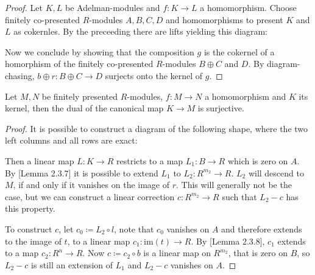 \begin{proof}
  Let $K,L$ be Adelman-modules and $f:K\to L$ a homomorphism.
  Choose finitely co-presented $R$-modules $A,B,C,D$ and homomorphisms to present $K$ and $L$ as cokernles.
  By the preceeding  there are lifts yielding this diagram:
  \begin{center}
  \end{center}
  Now we conclude by showing that the composition $g$ is the cokernel of a homorphism of the finitely co-presented $R$-modules $B\oplus C$ and $D$.
  By diagram-chasing, $b\oplus r:B\oplus C\to D$ surjects onto the kernel of $g$.
\end{proof}

\begin{lemma}
  \label{fp-kernel-dual-surjective}
  Let $M,N$ be finitely presented $R$-modules, $f:M\to N$ a homomorphism and $K$ its kernel,
  then the dual of the canonical map $K\to M$ is surjective.
\end{lemma}

\begin{proof}
  It is possible  to construct a diagram of the following shape, where the two left columns and all rows are exact:
  \begin{center}
  \end{center}
  Then a linear map $L:K\to R$ restricts to a map $L_1:B\to R$ which is zero on $A$.
  By \cite{diffgeo-article}[Lemma 2.3.7] it is possible to extend $L_1$ to $L_2:R^{m_2}\to R$.
  $L_2$ will descend to $M$, if and only if it vanishes on the image of $r$.
  This will generally not be the case, but we can construct a linear correction $c:R^{m_2}\to R$ such that $L_2-c$ has this property.

  To construct $c$, let $c_0\coloneq L_2\circ l$, note that $c_0$ vanishes on $A$ and therefore extends to the image of $t$, to a linear map $c_1:\mathrm{im}(t)\to R$.
  By \cite{diffgeo-article}[Lemma 2.3.8], $c_1$ extends to a map $c_2:R^{n}\to R$.
  Now $c\coloneq c_2\circ b$ is a linear map on $R^{m_2}$, that is zero on $B$,
  so $L_2-c$ is still an extension of $L_1$ and $L_2-c$ vanishes on $A$.
\end{proof}

